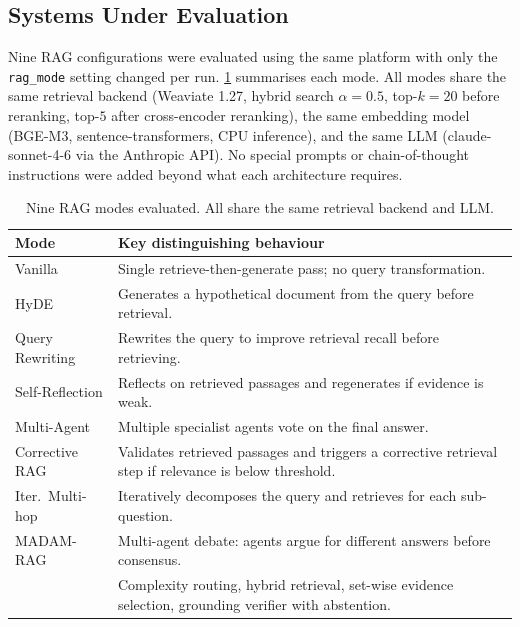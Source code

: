 \subsection{Systems Under Evaluation}

Nine RAG configurations were evaluated using the same \medrag{} platform
with only the \texttt{rag\_mode} setting changed per run.
\cref{tab:mode_descriptions} summarises each mode.
All modes share the same retrieval backend (Weaviate 1.27, hybrid search
$\alpha = 0.5$, top-$k = 20$ before reranking, top-$5$ after cross-encoder
reranking), the same embedding model (BGE-M3, sentence-transformers, CPU
inference), and the same LLM (claude-sonnet-4-6 via the Anthropic API).
No special prompts or chain-of-thought instructions were added beyond what each
architecture requires.

\begin{table}[htbp]
  \centering
  \caption{Nine RAG modes evaluated. All share the same retrieval backend and LLM.}
  \label{tab:mode_descriptions}
  \begin{tabularx}{\textwidth}{@{}lX@{}}
    \toprule
    \textbf{Mode} & \textbf{Key distinguishing behaviour} \\
    \midrule
    Vanilla         & Single retrieve-then-generate pass; no query transformation. \\
    HyDE            & Generates a hypothetical document from the query before retrieval. \\
    Query Rewriting & Rewrites the query to improve retrieval recall before retrieving. \\
    Self-Reflection & Reflects on retrieved passages and regenerates if evidence is weak. \\
    Multi-Agent     & Multiple specialist agents vote on the final answer. \\
    Corrective RAG  & Validates retrieved passages and triggers a corrective retrieval
                      step if relevance is below threshold. \\
    Iter.\ Multi-hop & Iteratively decomposes the query and retrieves for each sub-question. \\
    MADAM-RAG       & Multi-agent debate: agents argue for different answers before consensus. \\
    \rarerag{}      & Complexity routing, hybrid retrieval, set-wise evidence selection,
                      grounding verifier with abstention. \\
    \bottomrule
  \end{tabularx}
\end{table}

